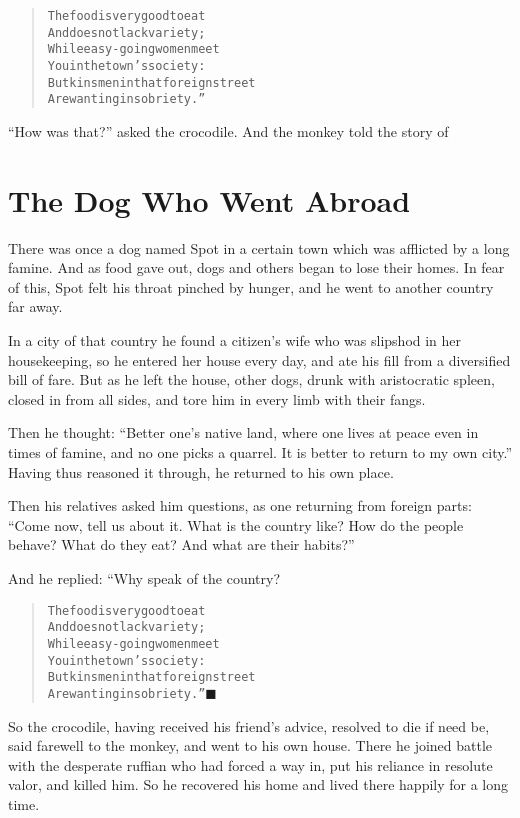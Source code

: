 \documentclass[article, twoside, 14pt]{memoir}
\newcommand{\qed}{\hfill \ensuremath{\blacksquare}}
\renewenvironment{verbatim}{%
\begin{quote}%
\vskip -10pt%
\begin{alltt}\normalfont\large}{\end{alltt}%
\end{quote}%
\vskip -10pt
} %
\begin{document}
\begin{verbatim}
The food is very good to eat
    And does not lack variety;
While easy-going women meet
    You in the town's society:
But kinsmen in that foreign street
    Are wanting in sobriety.”
\end{verbatim}
``How was that?'' asked the crocodile. And the monkey told the
story of

\chapter{The Dog Who Went Abroad}

\label{s77}

There was once a dog named Spot in a certain town which was
afflicted by a long famine. And as food gave out, dogs and others
began to lose their homes. In fear of this, Spot felt his throat
pinched by hunger, and he went to another country far away.

In a city of that country he found a citizen's wife who was
slipshod in her housekeeping, so he entered her house every day,
and ate his fill from a diversified bill of fare. But as he left
the house, other dogs, drunk with aristocratic spleen, closed in
from all sides, and tore him in every limb with their fangs.

Then he thought:
``Better one's native land, where one lives at peace even in times of famine, and no one picks a quarrel. It is better to return to my own city.''
Having thus reasoned it through, he returned to his own place.

Then his relatives asked him questions, as one returning from
foreign parts:
``Come now, tell us about it. What is the country like? How do the people behave? What do they eat? And what are their habits?''

And he replied: “Why speak of the country?

\begin{verbatim}
The food is very good to eat
    And does not lack variety;
While easy-going women meet
    You in the town's society:
But kinsmen in that foreign street
    Are wanting in sobriety.”\hyperref[s77]{\qed}
\end{verbatim}
So the crocodile, having received his friend's advice,
resolved to die if need be, said farewell to the monkey, and went
to his own house. There he joined battle with the desperate ruffian
who had forced a way in, put his reliance in resolute valor, and
killed him. So he recovered his home and lived there happily for a
long time.
\end{document}
